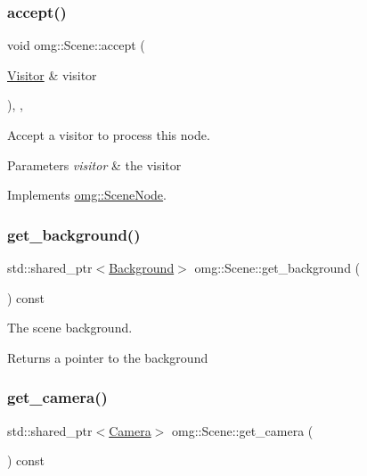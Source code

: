 \subsubsection{\texorpdfstring{accept()}{accept()}}
{\footnotesize\ttfamily void omg\+::\+Scene\+::accept (\begin{DoxyParamCaption}\item[{\mbox{\hyperlink{classomg_1_1_visitor}{Visitor}} \&}]{visitor }\end{DoxyParamCaption})\hspace{0.3cm}{\ttfamily [inline]}, {\ttfamily [override]}, {\ttfamily [virtual]}}



Accept a visitor to process this node. 


\begin{DoxyParams}{Parameters}
{\em visitor} & the visitor \\
\hline
\end{DoxyParams}


Implements \mbox{\hyperlink{classomg_1_1_scene_node_ad8e1595d15c4b92ab505828a0633a4d9}{omg\+::\+Scene\+Node}}.

\mbox{\label{classomg_1_1_scene_a2eef3b62d9d01b19fb32751942f1fa7c}} 
\subsubsection{\texorpdfstring{get\_background()}{get\_background()}}
{\footnotesize\ttfamily std\+::shared\+\_\+ptr$<$\mbox{\hyperlink{classomg_1_1_background}{Background}}$>$ omg\+::\+Scene\+::get\+\_\+background (\begin{DoxyParamCaption}{ }\end{DoxyParamCaption}) const\hspace{0.3cm}{\ttfamily [inline]}}



The scene background. 

\begin{DoxyReturn}{Returns}
a pointer to the background 
\end{DoxyReturn}
\mbox{\label{classomg_1_1_scene_a7f9aac9cd9ea4d984ac2df98ae553967}} 
\subsubsection{\texorpdfstring{get\_camera()}{get\_camera()}}
{\footnotesize\ttfamily std\+::shared\+\_\+ptr$<$\mbox{\hyperlink{classomg_1_1_camera}{Camera}}$>$ omg\+::\+Scene\+::get\+\_\+camera (\begin{DoxyParamCaption}{ }\end{DoxyParamCaption}) const\hspace{0.3cm}{\ttfamily [inline]}}



